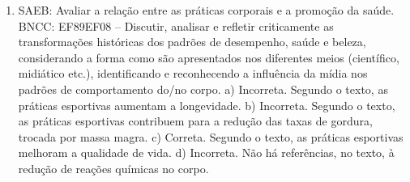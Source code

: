 \begin{enumerate}
\item
SAEB: Avaliar a relação entre as práticas corporais e a promoção da
saúde.
BNCC: EF89EF08 -- Discutir, analisar e refletir criticamente as
transformações históricas dos padrões de desempenho, saúde e beleza,
considerando a forma como são apresentados nos diferentes meios
(científico, midiático etc.), identificando e reconhecendo a influência
da mídia nos padrões de comportamento do/no corpo.
a) Incorreta. Segundo o texto, as práticas esportivas aumentam a
longevidade.
b) Incorreta. Segundo o texto, as práticas esportivas contribuem para a 
redução das taxas de gordura, trocada por massa magra.
c) Correta. Segundo o texto, as práticas esportivas melhoram a 
qualidade de vida.  
d) Incorreta. Não há referências, no texto, à redução de reações químicas
no corpo.
\end{enumerate}



